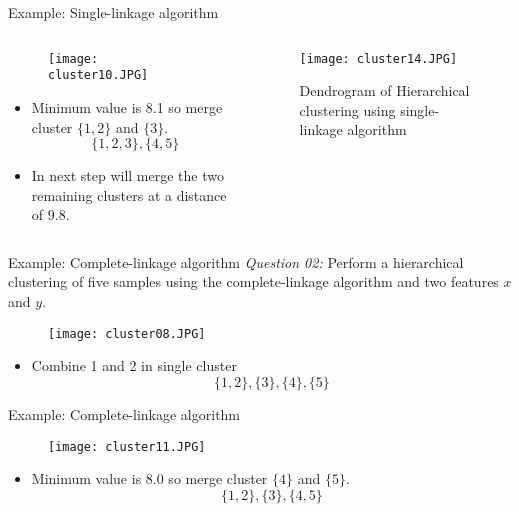\begin{frame}{Example: Single-linkage algorithm}
\begin{columns}
\begin{column}{5.5cm}
\begin{figure}
\texttt{[image: cluster10.JPG]}
\end{figure}
\begin{itemize}
\item Minimum value is 8.1 so merge cluster $\{1,2\}$ and $\{3\}$.
\begin{equation}
\{1,2,3\},\{4,5\}\nonumber
\end{equation}
\item In next step will merge the two remaining clusters at a distance of 9.8.
\end{itemize}
\end{column}
\begin{column}{5.5cm}
\begin{figure}
\texttt{[image: cluster14.JPG]}
\caption{Dendrogram of Hierarchical clustering using single-linkage algorithm}
\end{figure}
\end{column}
\end{columns}
\end{frame}

\begin{frame}{Example: Complete-linkage algorithm}
\textit{\color{slidecolor}Question 02:} Perform a hierarchical clustering of five samples using the complete-linkage algorithm and two features $x$ and $y$.
\begin{figure}
\texttt{[image: cluster08.JPG]}
\end{figure}
\begin{itemize}
\item Combine 1 and 2 in single cluster
\begin{equation}
\{1,2\},\{3\},\{4\},\{5\}\nonumber
\end{equation}
\end{itemize}
\end{frame}

\begin{frame}{Example: Complete-linkage algorithm}
\begin{figure}
\texttt{[image: cluster11.JPG]}
\end{figure}
\begin{itemize}
\item Minimum value is 8.0 so merge cluster $\{4\}$ and $\{5\}$.
\begin{equation}
\{1,2\},\{3\},\{4,5\}\nonumber
\end{equation}
\end{itemize}
\end{frame}

